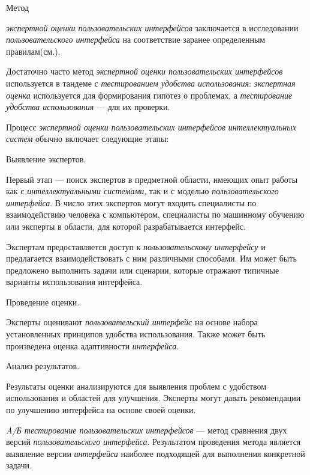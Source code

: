 Метод {\textit{экспертной оценки пользовательских интерфейсов} заключается в исследовании \textit{пользовательского интерфейса} на соответствие заранее определенным правилам(см.).

Достаточно часто метод \textit{экспертной оценки пользовательских интерфейсов} используется в тандеме с \textit{тестированием удобства использования}: \textit{экспертная оценка} используется для формирования гипотез о проблемах, а \textit{тестирование удобства использования} --- для их проверки.

Процесс \textit{экспертной оценки пользовательских интерфейсов} \textit{интеллектуальных систем} обычно включает следующие этапы:

\begin{textitemize}
\item Выявление экспертов. 

Первый этап --- поиск экспертов в предметной области, имеющих опыт работы как с \textit{интеллектуальными системами}, так и с моделью \textit{пользовательского интерфейса}. В число этих экспертов могут входить специалисты по взаимодействию человека с компьютером, специалисты по машинному обучению или эксперты в области, для которой разрабатывается интерфейс.

Экспертам предоставляется доступ к \textit{пользовательскому интерфейсу} и предлагается взаимодействовать с ним различными способами. Им может быть предложено выполнить задачи или сценарии, которые отражают типичные варианты использования интерфейса.

\item Проведение оценки. 

Эксперты оценивают \textit{пользовательский интерфейс} на основе набора установленных принципов удобства использования. Также может быть произведена оценка адаптивности \textit{интерфейса}.

\item Анализ результатов. 

Результаты оценки анализируются для выявления проблем с удобством использования и областей для улучшения. Эксперты могут давать рекомендации по улучшению интерфейса на основе своей оценки.
\end{textitemize}

\textit{A/Б тестирование пользовательских интерфейсов} --- метод сравнения двух версий \textit{пользовательского интерфейса}. Результатом проведения метода является выявление версии \textit{интерфейса} наиболее подходящей для выполнения конкретной задачи.

}
